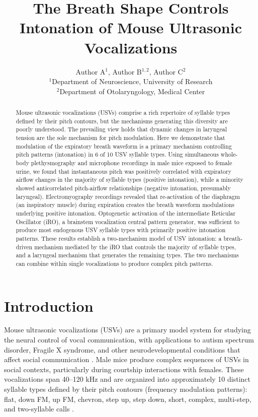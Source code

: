 \documentclass[11pt]{article}
\title{The Breath Shape Controls Intonation of Mouse Ultrasonic Vocalizations}
\author{Author A$^{1}$, Author B$^{1,2}$, Author C$^{2}$ \\
\small $^{1}$Department of Neuroscience, University of Research \\
\small $^{2}$Department of Otolaryngology, Medical Center}
\date{}
\begin{document}
\maketitle

\begin{abstract}
Mouse ultrasonic vocalizations (USVs) comprise a rich repertoire of syllable types defined by their pitch contours, but the mechanisms generating this diversity are poorly understood. The prevailing view holds that dynamic changes in laryngeal tension are the sole mechanism for pitch modulation. Here we demonstrate that modulation of the expiratory breath waveform is a primary mechanism controlling pitch patterns (intonation) in 6 of 10 USV syllable types. Using simultaneous whole-body plethysmography and microphone recordings in male mice exposed to female urine, we found that instantaneous pitch was positively correlated with expiratory airflow changes in the majority of syllable types (positive intonation), while a minority showed anticorrelated pitch-airflow relationships (negative intonation, presumably laryngeal). Electromyography recordings revealed that re-activation of the diaphragm (an inspiratory muscle) during expiration creates the breath waveform modulations underlying positive intonation. Optogenetic activation of the intermediate Reticular Oscillator (iRO), a brainstem vocalization central pattern generator, was sufficient to produce most endogenous USV syllable types with primarily positive intonation patterns. These results establish a two-mechanism model of USV intonation: a breath-driven mechanism mediated by the iRO that controls the majority of syllable types, and a laryngeal mechanism that generates the remaining types. The two mechanisms can combine within single vocalizations to produce complex pitch patterns.
\end{abstract}

\section{Introduction}

Mouse ultrasonic vocalizations (USVs) are a primary model system for studying the neural control of vocal communication, with applications to autism spectrum disorder, Fragile X syndrome, and other neurodevelopmental conditions that affect social communication \citep{holy2005,portfors2007,scattoni2009}. Male mice produce complex sequences of USVs in social contexts, particularly during courtship interactions with females. These vocalizations span 40--120 kHz and are organized into approximately 10 distinct syllable types defined by their pitch contours (frequency modulation patterns): flat, down FM, up FM, chevron, step up, step down, short, complex, multi-step, and two-syllable calls \citep{grimsley2011}.
\end{document}
